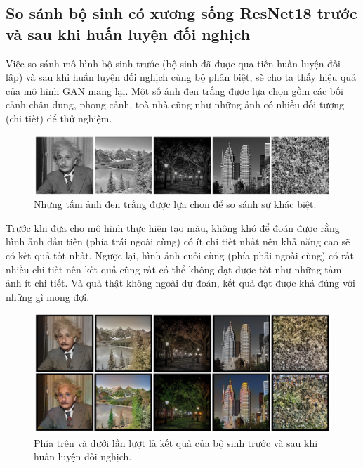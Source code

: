 \documentclass[a4paper, 12pt]{article}
\begin{document}
\subsection{So sánh bộ sinh có xương sống ResNet18 trước và sau khi huấn luyện đối nghịch}\label{compare}

Việc so sánh mô hình bộ sinh trước (bộ sinh đã được qua tiền huấn luyện đối lập) và sau khi huấn luyện đối nghịch cùng bộ phân biệt, sẽ cho ta thấy hiệu quả của mô hình GAN mang lại. Một số ảnh đen trắng được lựa chọn gồm các bối cảnh chân dung, phong cảnh, toà nhà cũng như những ảnh có nhiều đối tượng (chi tiết) để thử nghiệm.

\begin{figure}[!h]
\captionsetup{width=0.8\textwidth}
\centering
\includegraphics[width=15cm]{images/4_2.PNG}
\caption{Những tấm ảnh đen trắng được lựa chọn để so sánh sự khác biệt.}
\end{figure}

\noindent
Trước khi đưa cho mô hình thực hiện tạo màu, không khó để đoán được rằng hình ảnh đầu tiên (phía trái ngoài cùng) có ít chi tiết nhất nên khả năng cao sẽ có kết quả tốt nhất. Ngược lại, hình ảnh cuối cùng (phía phải ngoài cùng) có rất nhiều chi tiết nên kết quả cũng rất có thể không đạt được tốt như những tấm ảnh ít chi tiết. Và quả thật không ngoài dự đoán, kết quả đạt được khá đúng với những gì mong đợi.

\begin{figure}[!h]
\captionsetup{width=0.8\textwidth}
\centering
\includegraphics[width=15cm]{images/4_3.PNG}
\caption{Phía trên và dưới lần lượt là kết quả của bộ sinh trước và sau khi huấn luyện đối nghịch.}
\label{fig:comparesimpleandgan}
\end{figure}
\end{document}
